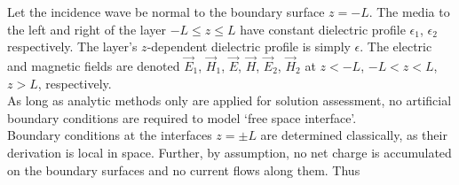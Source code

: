 \documentclass[twocolumn,secnumarabic,amssymb, nobibnotes, aps, prd]{revtex4-1}
\begin{document}
Let the incidence wave be normal to the boundary surface $z=-L$. The  media to the  left and right of the layer $-L \leq z \leq L$ have constant dielectric profile $\epsilon_{1}$, $\epsilon_2$ respectively. The layer's $z$-dependent dielectric profile is simply $\epsilon$. The electric and magnetic fields are denoted $\overrightarrow{E}_1$, $\overrightarrow{H}_1$, $\overrightarrow{E}$, $\overrightarrow{H}$, $\overrightarrow{E}_2$, $\overrightarrow{H}_2$ at $z<-L$, $-L<z<L$, $z>L$, respectively.\\ 
As long as analytic methods only are applied for solution assessment, no artificial boundary conditions are required to model `free space interface'.\\
Boundary conditions at the interfaces $z= \pm L$ are determined classically, as their derivation is local in space. Further, by assumption, no net charge is accumulated on the boundary surfaces and no current flows along them. Thus
\end{document}
